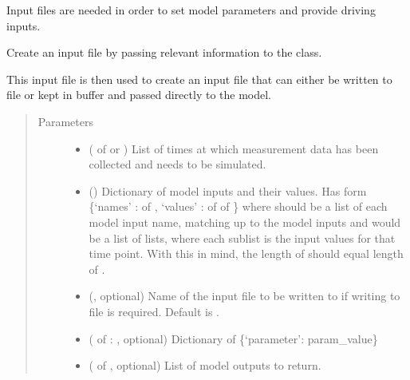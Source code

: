 \documentclass[letterpaper,10pt,english]{sphinxmanual}
\begin{document}
Input files are needed in order to set model parameters and provide driving
inputs.

\begin{fulllineitems}
\label{\detokenize{bcmdModel:bayescmd.bcmdModel.InputCreator}}
Create an input file by passing relevant information to the class.

This input file is then used to create an input file that can either be
written to file or kept in buffer and passed directly to the model.
\begin{quote}\begin{description}
\item[{Parameters}] \leavevmode\begin{itemize}
\item {} 
 ( of  or ) \textendash{} List of times at which measurement data has been collected and needs
to be simulated.

\item {} 
 () \textendash{} Dictionary of model inputs and their values. Has form
\{‘names’ :  of ,
‘values’ :  of  of \}
where  should be a list of each model input name, matching up to
the model inputs and  would be a list of lists, where each
sublist is the input values for that time point. With this in mind,
the length of  should equal length of .

\item {} 
 (, optional) \textendash{} Name of the input file to be written to if writing to file is required.
Default is .

\item {} 
 ( of : , optional) \textendash{} Dictionary of \{‘parameter’: param\_value\}

\item {} 
 ( of , optional) \textendash{} List of model outputs to return.


\end{itemize}
\end{description}
\end{quote}
\end{fulllineitems}
\end{document}
